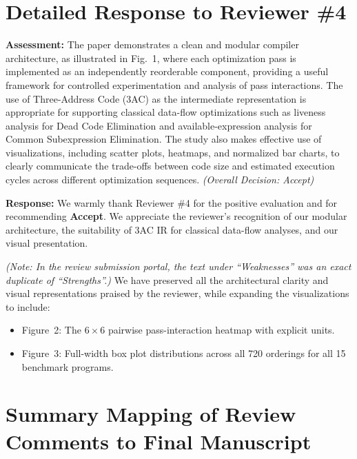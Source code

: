 \documentclass[10pt,a4paper]{article}
\begin{document}
\vspace{1em}
\section*{Detailed Response to Reviewer \#4}

\begin{reviewercomment}
\textbf{Assessment:} The paper demonstrates a clean and modular compiler architecture, as illustrated in Fig.~1, where each optimization pass is implemented as an independently reorderable component, providing a useful framework for controlled experimentation and analysis of pass interactions. The use of Three-Address Code (3AC) as the intermediate representation is appropriate for supporting classical data-flow optimizations such as liveness analysis for Dead Code Elimination and available-expression analysis for Common Subexpression Elimination. The study also makes effective use of visualizations, including scatter plots, heatmaps, and normalized bar charts, to clearly communicate the trade-offs between code size and estimated execution cycles across different optimization sequences. \textit{(Overall Decision: Accept)}
\end{reviewercomment}

\noindent \textbf{Response:} We warmly thank Reviewer \#4 for the positive evaluation and for recommending \textbf{Accept}. We appreciate the reviewer's recognition of our modular architecture, the suitability of 3AC IR for classical data-flow analyses, and our visual presentation.

\textit{(Note: In the review submission portal, the text under ``Weaknesses'' was an exact duplicate of ``Strengths''.)} We have preserved all the architectural clarity and visual representations praised by the reviewer, while expanding the visualizations to include:
\begin{itemize}[itemsep=1pt,parsep=0pt,topsep=2pt]
    \item Figure~2: The $6 \times 6$ pairwise pass-interaction heatmap with explicit units.
    \item Figure~3: Full-width box plot distributions across all 720 orderings for all 15 benchmark programs.
\end{itemize}

\vspace{1em}
\section*{Summary Mapping of Review Comments to Final Manuscript}
\end{document}
